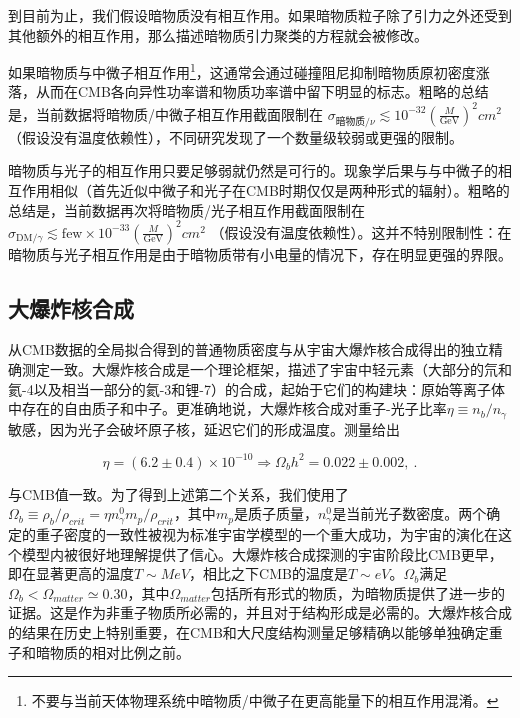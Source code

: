 到目前为止，我们假设暗物质没有相互作用。如果暗物质粒子除了引力之外还受到其他额外的相互作用，那么描述暗物质引力聚类的方程就会被修改。

如果暗物质与中微子相互作用\footnote{不要与当前天体物理系统中暗物质/中微子在更高能量下的相互作用混淆。}，这通常会通过碰撞阻尼抑制暗物质原初密度涨落，从而在CMB各向异性功率谱和物质功率谱中留下明显的标志。粗略的总结是，当前数据将暗物质/中微子相互作用截面限制在 \( \sigma_{\text{暗物质}/\nu} \lesssim 10^{-32} (\frac{M}{\text{GeV}})^2 cm^2\) （假设没有温度依赖性），不同研究发现了一个数量级较弱或更强的限制。

暗物质与光子的相互作用只要足够弱就仍然是可行的。现象学后果与与中微子的相互作用相似（首先近似中微子和光子在CMB时期仅仅是两种形式的辐射）。粗略的总结是，当前数据再次将暗物质/光子相互作用截面限制在 \( \sigma_{\text{DM}/\gamma} \lesssim \text{few} \times 10^{-33} (\frac{M}{\text{GeV}})^2 cm^2\) （假设没有温度依赖性）。这并不特别限制性：在暗物质与光子相互作用是由于暗物质带有小电量的情况下，存在明显更强的界限。

\subsection{大爆炸核合成} 

从CMB数据的全局拟合得到的普通物质密度与从宇宙大爆炸核合成得出的独立精确测定一致。大爆炸核合成是一个理论框架，描述了宇宙中轻元素（大部分的氘和氦-4以及相当一部分的氦-3和锂-7）的合成，起始于它们的构建块：原始等离子体中存在的自由质子和中子。更准确地说，大爆炸核合成对重子-光子比率$\eta \equiv  n_b/n_\gamma$敏感，因为光子会破坏原子核，延迟它们的形成温度。测量给出

\[ \eta = (6.2 \pm 0.4) \times 10^{-10} \Rightarrow \Omega_b h^2 = 0.022 \pm 0.002,~. \]

与CMB值一致。为了得到上述第二个关系，我们使用了$ \Omega_b \equiv  \rho_b/\rho_{crit} = \eta n^0_\gamma m_p/\rho_{crit}$，其中$m_p$是质子质量，$n^0_\gamma$是当前光子数密度。两个确定的重子密度的一致性被视为标准宇宙学模型的一个重大成功，为宇宙的演化在这个模型内被很好地理解提供了信心。大爆炸核合成探测的宇宙阶段比CMB更早，即在显著更高的温度$T \sim MeV$，相比之下CMB的温度是$T \sim eV$。$\Omega_b$满足$\Omega_b < \Omega_{matter} \simeq 0.30$，其中$\Omega_{matter}$包括所有形式的物质，为暗物质提供了进一步的证据。这是作为非重子物质所必需的，并且对于结构形成是必需的。大爆炸核合成的结果在历史上特别重要，在CMB和大尺度结构测量足够精确以能够单独确定重子和暗物质的相对比例之前。






